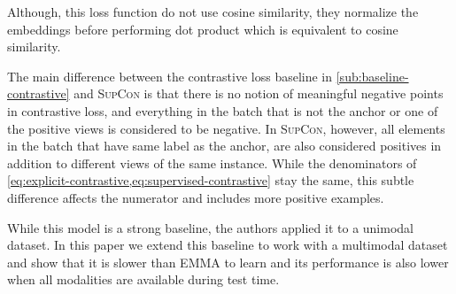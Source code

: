 \documentclass[10pt]{article} %
\newcommand{\ours}{\textsc{EMMA}}
\newcommand{\supcon}{\textsc{SupCon}}
\begin{document}

Although, this loss function do not use cosine similarity, they normalize the embeddings before performing dot product which is equivalent to cosine similarity.

The main difference between the contrastive loss baseline in \cref{sub:baseline-contrastive} and \supcon{} is that there is no notion of meaningful negative points in contrastive loss, and everything in the batch that is not the anchor or one of the positive views is considered to be negative. In \supcon{}, however, all elements in the batch that have same label as the anchor, are also considered positives in addition to different views of the same instance. While the denominators of \cref{eq:explicit-contrastive,eq:supervised-contrastive} stay the same, this subtle difference affects the numerator and includes more positive examples.

While this model is a strong baseline, the authors applied it to a unimodal dataset. In this paper we extend this baseline to work with a multimodal dataset and show that it is slower than \ours{} to learn and its performance is also lower when all modalities are available during test time.
\end{document}

